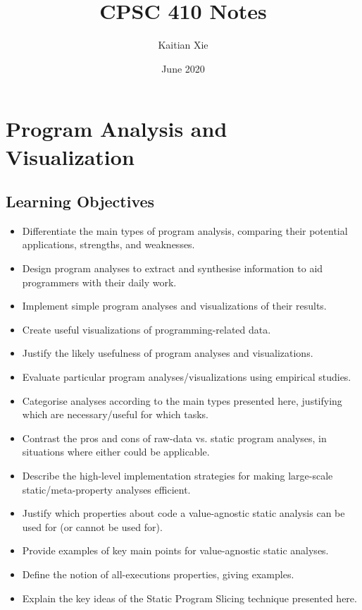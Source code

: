 \documentclass{article}
\title{CPSC 410 Notes}
\author{Kaitian Xie}
\date{June 2020}
\begin{document}
\maketitle
\pagebreak

\tableofcontents
\pagebreak

\section{Program Analysis and Visualization}

\subsection{Learning Objectives}

\begin{itemize}
    \item Differentiate the main types of program analysis, comparing their potential applications, strengths, and weaknesses.
    \item Design program analyses to extract and synthesise information to aid programmers with their daily work.
    \item Implement simple program analyses and visualizations of their results.
    \item Create useful visualizations of programming-related data.
    \item Justify the likely usefulness of program analyses and visualizations.
    \item Evaluate particular program analyses/visualizations using empirical studies.
    \item Categorise analyses according to the main types presented here, justifying which are necessary/useful for which tasks.
    \item Contrast the pros and cons of raw-data vs. static program analyses, in situations where either could be applicable.
    \item Describe the high-level implementation strategies for making large-scale static/meta-property analyses efficient.
    \item Justify which properties about code a value-agnostic static analysis can be used for (or cannot be used for).
    \item Provide examples of key main points for value-agnostic static analyses.
    \item Define the notion of all-executions properties, giving examples.
    \item Explain the key ideas of the Static Program Slicing technique presented here.

\end{itemize}
\end{document}
